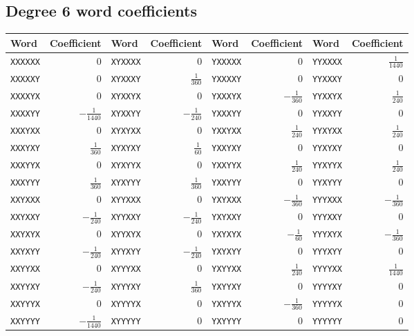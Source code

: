 \subsection*{Degree 6 word coefficients}
\begin{center}\small\begin{tabular}{lrlrlrlr}\toprule
Word & Coefficient & Word & Coefficient & Word & Coefficient & Word & Coefficient\\\midrule
\texttt{XXXXXX} & $0$ & \texttt{XYXXXX} & $0$ & \texttt{YXXXXX} & $0$ & \texttt{YYXXXX} & $\tfrac{1}{1440}$\\
\texttt{XXXXXY} & $0$ & \texttt{XYXXXY} & $\tfrac{1}{360}$ & \texttt{YXXXXY} & $0$ & \texttt{YYXXXY} & $0$\\
\texttt{XXXXYX} & $0$ & \texttt{XYXXYX} & $0$ & \texttt{YXXXYX} & $-\tfrac{1}{360}$ & \texttt{YYXXYX} & $\tfrac{1}{240}$\\
\texttt{XXXXYY} & $-\tfrac{1}{1440}$ & \texttt{XYXXYY} & $-\tfrac{1}{240}$ & \texttt{YXXXYY} & $0$ & \texttt{YYXXYY} & $0$\\
\texttt{XXXYXX} & $0$ & \texttt{XYXYXX} & $0$ & \texttt{YXXYXX} & $\tfrac{1}{240}$ & \texttt{YYXYXX} & $\tfrac{1}{240}$\\
\texttt{XXXYXY} & $\tfrac{1}{360}$ & \texttt{XYXYXY} & $\tfrac{1}{60}$ & \texttt{YXXYXY} & $0$ & \texttt{YYXYXY} & $0$\\
\texttt{XXXYYX} & $0$ & \texttt{XYXYYX} & $0$ & \texttt{YXXYYX} & $\tfrac{1}{240}$ & \texttt{YYXYYX} & $\tfrac{1}{240}$\\
\texttt{XXXYYY} & $\tfrac{1}{360}$ & \texttt{XYXYYY} & $\tfrac{1}{360}$ & \texttt{YXXYYY} & $0$ & \texttt{YYXYYY} & $0$\\
\texttt{XXYXXX} & $0$ & \texttt{XYYXXX} & $0$ & \texttt{YXYXXX} & $-\tfrac{1}{360}$ & \texttt{YYYXXX} & $-\tfrac{1}{360}$\\
\texttt{XXYXXY} & $-\tfrac{1}{240}$ & \texttt{XYYXXY} & $-\tfrac{1}{240}$ & \texttt{YXYXXY} & $0$ & \texttt{YYYXXY} & $0$\\
\texttt{XXYXYX} & $0$ & \texttt{XYYXYX} & $0$ & \texttt{YXYXYX} & $-\tfrac{1}{60}$ & \texttt{YYYXYX} & $-\tfrac{1}{360}$\\
\texttt{XXYXYY} & $-\tfrac{1}{240}$ & \texttt{XYYXYY} & $-\tfrac{1}{240}$ & \texttt{YXYXYY} & $0$ & \texttt{YYYXYY} & $0$\\
\texttt{XXYYXX} & $0$ & \texttt{XYYYXX} & $0$ & \texttt{YXYYXX} & $\tfrac{1}{240}$ & \texttt{YYYYXX} & $\tfrac{1}{1440}$\\
\texttt{XXYYXY} & $-\tfrac{1}{240}$ & \texttt{XYYYXY} & $\tfrac{1}{360}$ & \texttt{YXYYXY} & $0$ & \texttt{YYYYXY} & $0$\\
\texttt{XXYYYX} & $0$ & \texttt{XYYYYX} & $0$ & \texttt{YXYYYX} & $-\tfrac{1}{360}$ & \texttt{YYYYYX} & $0$\\
\texttt{XXYYYY} & $-\tfrac{1}{1440}$ & \texttt{XYYYYY} & $0$ & \texttt{YXYYYY} & $0$ & \texttt{YYYYYY} & $0$\\
\bottomrule\end{tabular}\end{center}
